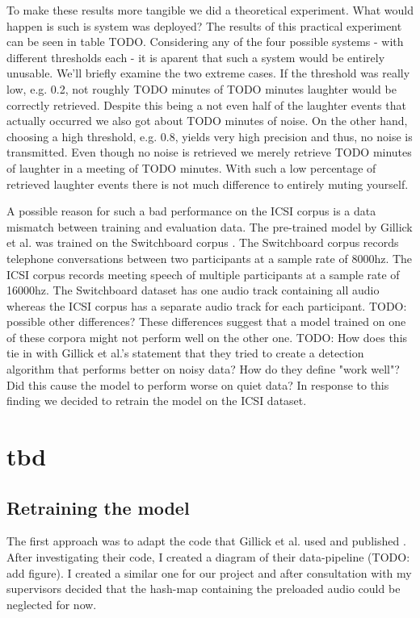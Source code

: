\documentclass[bsc,frontabs,parskip,deptreport]{infthesis}
\begin{document}
To make these results more tangible we did a theoretical experiment. What would happen is such is system was deployed? The results of this practical experiment can be seen in table TODO. 
Considering any of the four possible systems - with different thresholds each - it is aparent that such a system would be entirely unusable. We'll briefly examine the two extreme cases. If the threshold was really low, e.g. 0.2, not roughly TODO minutes of TODO minutes laughter would be correctly retrieved. Despite this being a not even half of the laughter events that actually occurred we also got about TODO minutes of noise.  
On the other hand, choosing a high threshold, e.g. 0.8, yields very high precision and thus, no noise is transmitted. Even though no noise is retrieved we merely retrieve TODO minutes of laughter in a meeting of TODO minutes. With such a low percentage of retrieved laughter events there is not much difference to entirely muting yourself. 

A possible reason for such a bad performance on the ICSI corpus is a data mismatch between training and evaluation data. The pre-trained model by Gillick et al. \citep{gillick2021robust} was trained on the Switchboard corpus \citep{switchboard-corpus}. The Switchboard corpus records telephone conversations between two participants at a sample rate of 8000hz. The ICSI corpus records meeting speech of multiple participants at a sample rate of 16000hz. The Switchboard dataset has one audio track containing all audio whereas the ICSI corpus has a separate audio track for each participant.  
TODO: possible other differences?
These differences suggest that a model trained on one of these corpora might not perform well on the other one. 
TODO: How does this tie in with Gillick et al.'s statement that they tried to create a detection algorithm that performs better on noisy data? How do they define "work well"? Did this cause the model to perform worse on quiet data?
In response to this finding we decided to retrain the model on the ICSI dataset. 

\chapter{tbd}
\section{Retraining the model} \label{sec:retraining}
The first approach was to adapt the code that Gillick et al. used and published \citep{gillick-codebase}. After investigating their code, I created a diagram of their data-pipeline (TODO: add figure). 
I created a similar one for our project and after consultation with my supervisors decided that the hash-map containing the preloaded audio could be neglected for now. 
\end{document}
